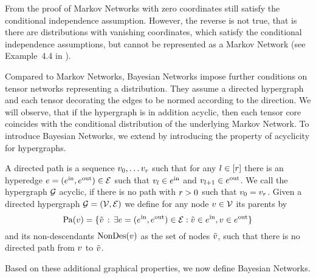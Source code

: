 From the proof of  Markov Networks with zero coordinates still satisfy the conditional independence assumption.
However, the reverse is not true, that is there are distributions with vanishing coordinates, which satisfy the conditional independence assumptions, but cannot be represented as a Markov Network (see Example~4.4 in \cite{koller_probabilistic_2009}).





Compared to Markov Networks, Bayesian Networks impose further conditions on tensor networks representing a distribution.
They assume a directed hypergraph and each tensor decorating the edges to be normed according to the direction.
We will observe, that if the hypergraph is in addition acyclic, then each tensor core coincides with the conditional distribution of the underlying Markov Network.
To introduce Bayesian Networks, we extend  by introducing the property of acyclicity for hypergraphs.


\begin{definition}
	A directed path is a sequence $v_{0},\ldots v_{r}$ such that for any $l\in[r]$ there is an hyperedge $e=(e^{\mathrm{in}},e^{\mathrm{out}})\in\mathcal{E}$ such that $v_{l}\in e^{\mathrm{in}}$ and $v_{l+1}\in e^{\mathrm{out}}$.
	We call the hypergraph $\mathcal{G}$ acyclic, if there is no path with $r>0$ such that $v_{0}=v_{r}$.
	Given a directed hypergraph $\mathcal{G}=(\mathcal{V},\mathcal{E})$ we define for any node $v\in\mathcal{V}$ its parents by
		\[ \mathrm{Pa}(v) = \{\tilde{v} \, : \, \exists e=(e^{\mathrm{in}},e^{\mathrm{out}})\in\mathcal{E}: \tilde{v}\in e^{\mathrm{in}},v\in e^{\mathrm{out}} \} \]
	and its non-descendants $\mathrm{NonDes}(v)$ as the set of nodes $\tilde{v}$, such that there is no directed path from $v$ to $\tilde{v}$.
\end{definition}

Based on these additional graphical properties, we now define Bayesian Networks.

